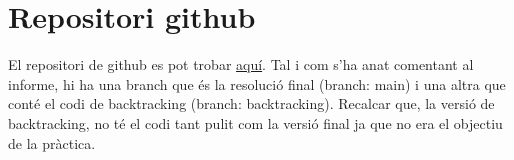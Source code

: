 \documentclass[12pt, letterpaper]{article}
\begin{document}
\newpage

\appendix

\section{Repositori github}
\label{github}

El repositori de github es pot trobar \href{https://github.com/Algorismia/Aquaeductus}{aquí}. Tal i com s'ha anat comentant al informe, hi ha una branch que és la resolució final (branch: main) i una altra que conté el codi de backtracking (branch: backtracking).
Recalcar que, la versió de backtracking, no té el codi tant pulit com la versió final ja que no era el objectiu de la pràctica.
\end{document}
